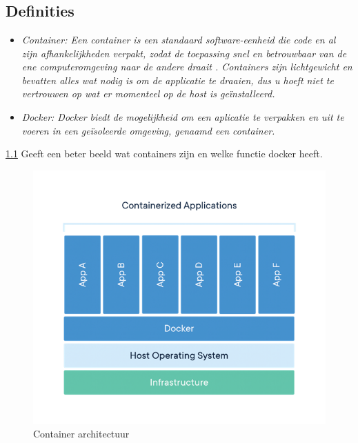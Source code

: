 \chapter{}%
\label{ch:stand-van-zaken}


\section{Definities}

\begin{itemize}
    \item \textit{Container: Een container is een standaard software-eenheid die code en al zijn afhankelijkheden verpakt, zodat de toepassing snel en betrouwbaar van de ene computeromgeving naar de andere draait \autocite{Docker-2023}. Containers zijn lichtgewicht en bevatten alles wat nodig is om de applicatie te draaien, dus u hoeft niet te vertrouwen op wat er momenteel op de host is geïnstalleerd. \autocite{DockerDocs-2023} }
    \item \textit{Docker: Docker biedt de mogelijkheid om een aplicatie te verpakken en uit te voeren in een geïsoleerde omgeving, genaamd een container.  \autocite{DockerDocs-2023} }
\end{itemize}

\ref{fig:KubernetesContainers} Geeft een beter beeld wat containers zijn en welke functie docker heeft.

\begin{flushleft}
    \begin{figure}[h]
        \includegraphics[width=.49\textwidth]{graphics/container.png}
        \caption{\label{fig:KubernetesContainers}Container architectuur \autocite{Docker-2023}}
    \end{figure} 
\end{flushleft}

